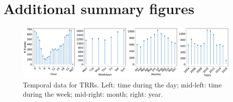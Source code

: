 \section{Additional summary figures}

\begin{figure}[h] 
	\includegraphics[width=\textwidth]{figs/trrs_times} 
	\caption{Temporal data for TRRs. Left: time during the day; mid-left: time during the week; mid-right: month; right: year.} \label{fig:trrs_times}
\end{figure}

